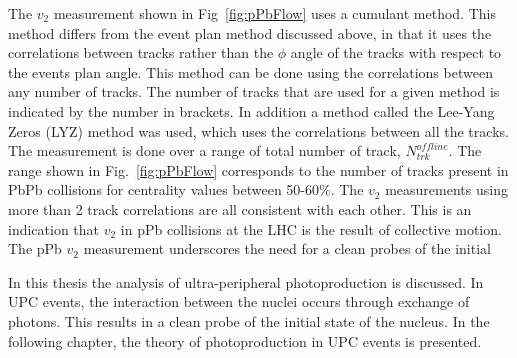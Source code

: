       The $v_{2}$ measurement shown in Fig~\ref{fig:pPbFlow} uses a cumulant 
        method.
      This method differs from the event plan method discussed above, in that 
        it uses the correlations between tracks rather than the $\phi$ angle 
        of the tracks with respect to the events plan angle.
      This method can be done using the correlations between any number of 
        tracks. 
      The number of tracks that are used for a given method is 
        indicated by the number in brackets. 
      In addition a method called the Lee-Yang Zeros (LYZ) method was used, 
        which uses the correlations between all the tracks. 
      The measurement is done over a range of total number of track, 
        $N^{offline}_{trk}$. 
      The range shown in Fig.~\ref{fig:pPbFlow} corresponds to the number of 
        tracks present in PbPb collisions for centrality values between 50-60\%.
      The $v_{2}$ measurements using more than 2 track correlations are all 
        consistent with each other.
      This is an indication that $v_{2}$ in pPb collisions at the LHC is the
        result of collective motion.
      The pPb $v_{2}$ measurement underscores the need for a clean probes of the initial 

      In this thesis the analysis of ultra-peripheral \JPsi{} photoproduction 
        is discussed. 
      In UPC events, the interaction between the nuclei occurs through
        exchange of photons. 
      This results in a clean probe of the initial state of the nucleus.
      In the following chapter, the theory of \JPsi{ } photoproduction in 
        UPC events is presented. 
      
